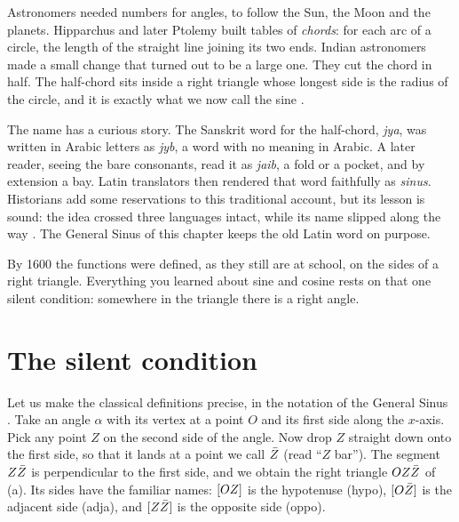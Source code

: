 
Astronomers needed numbers for angles, to follow the Sun, the Moon and the planets. Hipparchus and later Ptolemy built tables of \emph{chords}: for each arc of a circle, the length of the straight line joining its two ends. Indian astronomers made a small change that turned out to be a large one. They cut the chord in half. The half-chord sits inside a right triangle whose longest side is the radius of the circle, and it is exactly what we now call the sine \citep{Plofker2009,VanBrummelen2009}.

The name has a curious story. The Sanskrit word for the half-chord, \emph{jya}, was written in Arabic letters as \emph{jyb}, a word with no meaning in Arabic. A later reader, seeing the bare consonants, read it as \emph{jaib}, a fold or a pocket, and by extension a bay. Latin translators then rendered that word faithfully as \emph{sinus}. Historians add some reservations to this traditional account, but its lesson is sound: the idea crossed three languages intact, while its name slipped along the way \citep{VanBrummelen2009,Maor1998}. The General Sinus of this chapter keeps the old Latin word on purpose.

By 1600 the functions were defined, as they still are at school, on the sides of a right triangle. Everything you learned about sine and cosine rests on that one silent condition: somewhere in the triangle there is a right angle.

\section{The silent condition}\label{sec:silent-condition}

Let us make the classical definitions precise, in the notation of the General Sinus \citep{Derraz2026GSP}. Take an angle $\alpha$ with its vertex at a point $O$ and its first side along the $x$-axis. Pick any point $Z$ on the second side of the angle. Now drop $Z$ straight down onto the first side, so that it lands at a point we call $\bar{Z}$ (read ``$Z$ bar''). The segment $Z\bar{Z}$ is perpendicular to the first side, and we obtain the right triangle $OZ\bar{Z}$ of (a). Its sides have the familiar names: $[OZ]$ is the hypotenuse (hypo), $[O\bar{Z}]$ is the adjacent side (adja), and $[Z\bar{Z}]$ is the opposite side (oppo).

